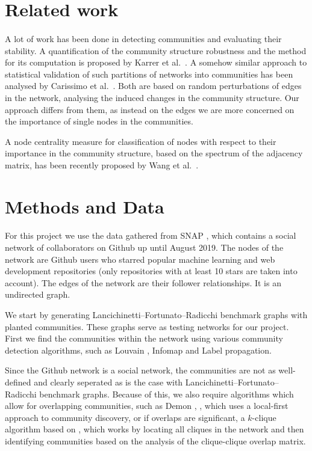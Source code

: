 \documentclass[9pt,twocolumn,twoside]{pnas-new}
\begin{document}
\section*{Related work}

\paragraph{} A lot of work has been done in detecting communities and evaluating their stability. A quantification of the community structure robustness and the method for its computation is proposed by Karrer et al.\ \cite{karrer-levina}. A somehow similar approach to statistical validation of such partitions of networks into communities has been analysed by Carissimo et al.\ \cite{carissimo}. Both are based on random perturbations of edges in the network, analysing the induced changes in the community structure. Our approach differs from them, as instead on the edges we are more concerned on the importance of single nodes in the communities. 

A node centrality measure for classification of nodes with respect to their importance in the community structure, based on the spectrum of the adjacency matrix, has been recently proposed by Wang et al.\ \cite{wang-yang-fan}.


\section*{Methods and Data}

\paragraph{}For this project we use the data gathered from SNAP \cite{github_graph}, 
which contains a social network of collaborators on Github up until August 2019. 
The nodes of the network are Github users who starred popular machine learning and web development repositories 
(only repositories with at least 10 stars are taken into account).
The edges of the network are their follower relationships. It is an undirected graph.

We start by generating Lancichinetti–Fortunato–Radicchi benchmark graphs with planted communities.
These graphs serve as testing networks for our project.
First we find the communities within the network using various community detection algorithms, such as Louvain \cite{louvain}, Infomap \cite{infomap} and Label propagation. 

Since the Github network is a social network, the communities are not as well-defined and clearly seperated as is the case with Lancichinetti–Fortunato–Radicchi benchmark graphs.
Because of this, we also require algorithms which allow for overlapping communities, 
such as Demon \cite{Demon}, \cite{coscia-rossetti}, which uses a local-first approach to community discovery, or if overlaps are significant,
a $k$-clique algorithm based on \cite{palla-derenyi}, which works by locating all cliques in the network and then identifying communities based on the analysis of the clique-clique overlap matrix.
\end{document}
